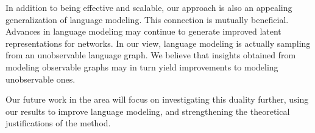 \documentclass{sig-alternate}
\begin{document}
In addition to being effective and scalable, our approach is also an appealing generalization of language modeling. 
This connection is mutually beneficial.  
Advances in language modeling may continue to generate improved latent representations for networks.
In our view, language modeling is actually sampling from an unobservable language graph.  We believe that insights obtained from modeling observable graphs may in turn yield improvements to modeling unobservable ones.

Our future work in the area will focus on investigating this duality further, using our results to improve language modeling, and strengthening the theoretical justifications of the method.




\end{document}
